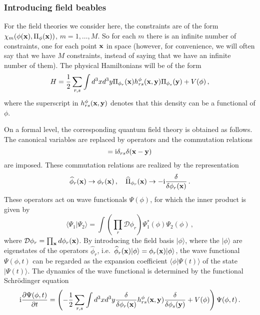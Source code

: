 \documentclass[12pt]{article}
\def\la{\langle}
\def\ra{\rangle}
\def\pa{\partial}
\def\ii{\textrm i}
\begin{document}
\subsubsection{Introducing field beables}\label{introducingfieldbeables}
For the field theories we consider here, the constraints are of the form $\chi_m(\phi({\bf x}),\Pi_{\phi}({\bf x}))$, $m=1,\dots,M$. So for each $m$ there is an infinite number of constraints, one for each point ${\bf x}$ in space (however, for convenience, we will often say that we have $M$ constraints, instead of saying that we have an infinite number of them). The physical Hamiltonians will be of the form
\begin{equation}
H= \frac{1}{2} \sum_{r,s} \int d^3 x  d^3y  \Pi_{\phi_r}({\bf x}) h^\phi_{rs}({\bf x},{\bf y})  \Pi_{\phi_s}({\bf y}) + V(\phi)\,,
\label{f.21}
\end{equation} 
where the superscript in $h^\phi_{rs}({\bf x},{\bf y})$ denotes that this density can be a functional of $\phi$. 

On a formal level, the corresponding quantum field theory is obtained as follows. The canonical variables are replaced by operators and the commutation relations 
\begin{equation}
[{\widehat \phi}_r({\bf x}),{\widehat \Pi}_{\phi_s}({\bf y})] = \ii\delta_{rs}\delta({\bf x}-{\bf y})
\label{f.22}
\end{equation}
are imposed. These commutation relations are realized by the representation
\begin{equation}
{\widehat \phi}_r({\bf x})\to \phi_r({\bf x})\,, \quad {\widehat \Pi}_{\phi_r}({\bf x}) \to -\ii \frac{\delta }{\delta \phi_r({\bf x})}\,.
\label{f.23}
\end{equation}
These operators act on wave functionals $\Psi(\phi)$, for which the inner product is given by
\begin{equation}
\la \Psi_1 | \Psi_2 \ra =\int \left( \prod_r {\mathcal D} \phi_r \right) \Psi^*_1(\phi) \Psi_2(\phi)  \,,
\label{f.24}
\end{equation}
where ${\mathcal D} \phi_r =\prod_{{\bf x}} d \phi_r({\bf x})$. By introducing the field basis $|\phi\ra$, where the $|\phi\ra$ are eigenstates of the operators ${\widehat \phi}_r$, i.e.\ ${\widehat \phi}_r({\bf x})|\phi\ra = \phi_r({\bf x}) |\phi\ra$, the wave functional $\Psi(\phi,t)$ can be regarded as the expansion coefficient $\la \phi| \Psi (t) \ra$ of the state $|\Psi(t)\ra$. The dynamics of the wave functional is determined by the functional Schr{\"o}\-ding\-er equation
\begin{equation}
\ii\frac{\pa \Psi(\phi,t)}{\pa t} = \left( - \frac{1}{2} \sum_{r,s} \int d^3 x  d^3y  \frac{\delta }{\delta \phi_r({\bf x})} h^\phi_{rs}({\bf x},{\bf y})  \frac{\delta }{\delta \phi_s({\bf y})}  + V(\phi)\right)\Psi(\phi,t) \,.
\label{f.25}
\end{equation}
\end{document}
